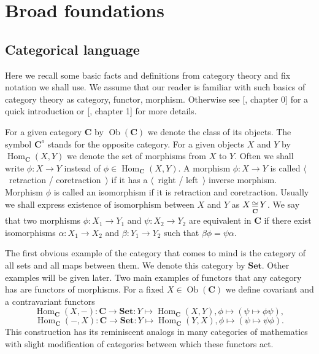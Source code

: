 
\section{
  Broad foundations
}\label{SectionBroadFoundations} 


\subsection{
  Categorical language
}\label{SubSectionCategoricalLanguage}

Here we recall some basic facts and definitions from category theory and fix
notation we shall use. We assume that our reader is familiar with such basics of
category theory as category, functor, morphism. Otherwise see
[\cite{HelLectAndExOnFuncAn}, chapter 0] for a quick introduction or
[\cite{KashivShapCatsAndSheavs}, chapter 1] for more details.

For a given category $\mathbf{C}$ by $\operatorname{Ob}(\mathbf{C})$ we denote
the class of its objects. The symbol $\mathbf{C}^o$ stands for the opposite
category. For a given objects $X$ and $Y$ by 
$\operatorname{Hom}_{\mathbf{C}}(X, Y)$ 
we denote the set of morphisms from $X$ to $Y$. Often we shall write
$\phi:X\to Y$ instead of $\phi\in\operatorname{Hom}_{\mathbf{C}}(X,Y)$. A
morphism $\phi:X\to Y$ is called $\langle$~retraction / coretraction~$\rangle$
if it has a $\langle$~right / left~$\rangle$ inverse morphism. Morphism $\phi$
is called an isomorphism if it is retraction and coretraction. Usually we shall
express existence of isomorphism between $X$ and $Y$ as $X\mathop{\mathbin{\cong}}\limits_{\mathbf{C}} Y$.
We say that two morphisms $\phi:X_1\to Y_1$ and $\psi:X_2\to Y_2$ are equivalent
in $\mathbf{C}$ if there exist isomorphisms $\alpha:X_1\to X_2$ and
$\beta:Y_1\to Y_2$ such that $\beta\phi=\psi\alpha$.

The first obvious example of the category that comes to mind is the category of
all sets and all maps between them. We denote this category by $\mathbf{Set}$.
Other examples will be given later. Two main examples of functors that any
category has are functors of morphisms. For a fixed
$X\in\operatorname{Ob}(\mathbf{C})$ we define covariant and a contravariant
functors
$$
\operatorname{Hom}_{\mathbf{C}}(X,-)
:\mathbf{C}\to\mathbf{Set}:Y\mapsto \operatorname{Hom}_{\mathbf{C}}(X,Y), 
\phi\mapsto(\psi\mapsto \phi\psi),
$$
$$
\operatorname{Hom}_{\mathbf{C}}(-,X)
:\mathbf{C}\to\mathbf{Set}:Y\mapsto \operatorname{Hom}_{\mathbf{C}}(Y,X), 
\phi\mapsto(\psi\mapsto \psi\phi).
$$
This construction has its reminiscent analogs in many categories of mathematics
with slight modification of categories between which these functors act.

